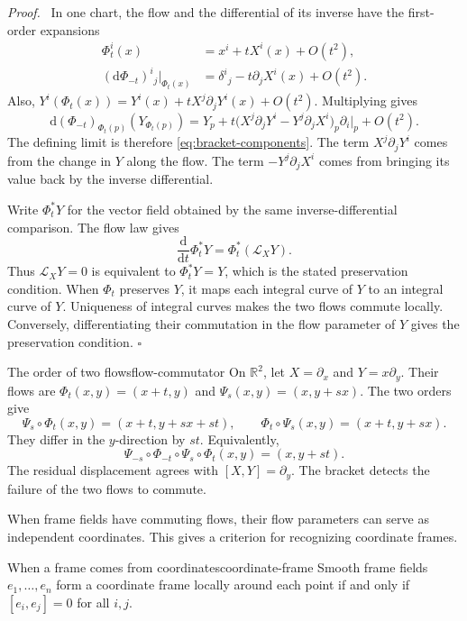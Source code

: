 \documentclass[11pt,a4paper]{article}
\numberwithin{equation}{section}
\newcommand{\R}{\mathbb R}
\newcommand{\dd}{\mathrm d}
\newcommand{\Lie}{\mathcal L}
\newcommand{\proofend}{\unskip\nobreak\hfill\(\square\)\par}
\newenvironment{proof}{\par\noindent\textit{Proof.}\ }{\proofend}
\begin{document}
\begin{proof}
In one chart, the flow and the differential of its inverse have the
first-order expansions
\[
 \begin{aligned}
 \Phi_t^i(x)&=x^i+tX^i(x)+O(t^2),\\
 (\dd\Phi_{-t})^i{}_j\big|_{\Phi_t(x)}
 &=\delta^i{}_j-t\partial_jX^i(x)+O(t^2).
 \end{aligned}
\]
Also,
\(Y^i(\Phi_t(x))=Y^i(x)+tX^j\partial_jY^i(x)+O(t^2)\).
Multiplying gives
\[
 \dd(\Phi_{-t})_{\Phi_t(p)}(Y_{\Phi_t(p)})
 =Y_p+t\bigl(X^j\partial_jY^i-Y^j\partial_jX^i\bigr)_p
      \partial_i|_p+O(t^2).
\]
The defining limit is therefore \eqref{eq:bracket-components}.
The term \(X^j\partial_jY^i\) comes from the change in \(Y\) along
the flow. The term \(-Y^j\partial_jX^i\) comes from bringing its value
back by the inverse differential.

Write \(\Phi_t^*Y\) for the vector field obtained by the same
inverse-differential comparison. The flow law gives
\[
 \frac{\dd}{\dd t}\Phi_t^*Y=\Phi_t^*(\Lie_XY).
\]
Thus \(\Lie_XY=0\) is equivalent to \(\Phi_t^*Y=Y\), which is the
stated preservation condition. When \(\Phi_t\) preserves \(Y\), it
maps each integral curve of \(Y\) to an integral curve of \(Y\).
Uniqueness of integral curves makes the two flows commute locally.
Conversely, differentiating their commutation in the flow parameter of
\(Y\) gives the preservation condition.
\end{proof}

\begin{examplebox}{The order of two flows}{flow-commutator}
On \(\R^2\), let \(X=\partial_x\) and \(Y=x\partial_y\). Their flows
are \(\Phi_t(x,y)=(x+t,y)\) and \(\Psi_s(x,y)=(x,y+sx)\). The two
orders give
\[
 \Psi_s\circ\Phi_t(x,y)=(x+t,y+sx+st),\qquad
 \Phi_t\circ\Psi_s(x,y)=(x+t,y+sx).
\]
They differ in the \(y\)-direction by \(st\). Equivalently,
\[
 \Psi_{-s}\circ\Phi_{-t}\circ\Psi_s\circ\Phi_t(x,y)=(x,y+st).
\]
The residual displacement agrees with \([X,Y]=\partial_y\). The
bracket detects the failure of the two flows to commute.
\end{examplebox}

When frame fields have commuting flows, their flow parameters can serve
as independent coordinates. This gives a criterion for recognizing
coordinate frames.

\begin{proposition}{When a frame comes from coordinates}{coordinate-frame}
Smooth frame fields \(e_1,\ldots,e_n\) form a coordinate frame locally
around each point if and only if \([e_i,e_j]=0\) for all \(i,j\).
\end{proposition}
\end{document}
